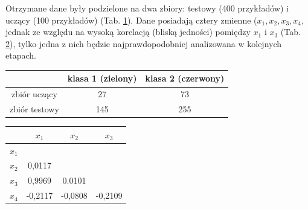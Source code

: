 Otrzymane dane były podzielone na dwa zbiory: testowy (400 przykładów) i uczący (100 przykładów) (Tab. \ref{tab:count}). Dane posiadają cztery zmienne ($x_1, x_2, x_3, x_4$, jednak ze względu na wysoką korelacją (bliską jedności) pomiędzy $x_1$ i $x_3$ (Tab. \ref{tab:corr}), tylko jedna z nich będzie najprawdopodobniej analizowana w kolejnych etapach.
    \begin{table}[h]
    \begin{center}
\begin{tabular}{|c|c|c|}
\hline
                                    & klasa 1 (zielony)                  & klasa 2 (czerwony)\\ \hline
zbiór uczący                        & 27                       & 73      \\ \hline
\multicolumn{1}{|c|}{zbiór testowy} & \multicolumn{1}{c|}{145} & 255     \\ \hline
\end{tabular}

 \label{tab:count}
\end{center}

\end{table}
\begin{table}[h]
\begin{center}
\begin{tabular}{|c|c|c|c|}
\hline
\multicolumn{1}{|c|}{}   & \multicolumn{1}{c|}{$x_1$}                       &  $x_2$                       & $x_3$                       \\ \hline
\multicolumn{1}{|c|}{$x_1$} & \multicolumn{1}{c|}{\cellcolor[HTML]{C0C0C0}} & \cellcolor[HTML]{C0C0C0} & \cellcolor[HTML]{C0C0C0} \\ \hline
$x_2$                      & 0,0117                                        & \cellcolor[HTML]{C0C0C0} & \cellcolor[HTML]{C0C0C0} \\ \hline
$x_3 $                      & 0,9969                                        & 0.0101                   & \cellcolor[HTML]{C0C0C0} \\ \hline
$x_4$                      & -0,2117                                       & -0,0808                  & -0,2109                  \\ \hline
\end{tabular}

  \label{tab:corr}
 \end{center}
\end{table}



